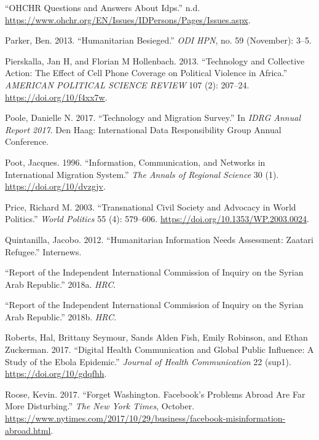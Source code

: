 \documentclass[
]{article}
\newlength{\cslhangindent}
\newenvironment{cslreferences}%
  {\setlength{\parindent}{0pt}%
  \everypar{\setlength{\hangindent}{\cslhangindent}}\ignorespaces}%
  {\par}
\begin{document}
\begin{cslreferences}
\leavevmode\hypertarget{ref-OHCHR}{}%
``OHCHR Questions and Answers About Idps.'' n.d.
\url{https://www.ohchr.org/EN/Issues/IDPersons/Pages/Issues.aspx}.

\leavevmode\hypertarget{ref-Parker2013Humanitarian}{}%
Parker, Ben. 2013. ``Humanitarian Besieged.'' \emph{ODI HPN}, no. 59
(November): 3--5.

\leavevmode\hypertarget{ref-Pierskalla2013Technology}{}%
Pierskalla, Jan H, and Florian M Hollenbach. 2013. ``Technology and
Collective Action: The Effect of Cell Phone Coverage on Political
Violence in Africa.'' \emph{AMERICAN POLITICAL SCIENCE REVIEW} 107 (2):
207--24. \url{https://doi.org/10/f4xx7w}.

\leavevmode\hypertarget{ref-Poole2017Technology}{}%
Poole, Danielle N. 2017. ``Technology and Migration Survey.'' In
\emph{IDRG Annual Report 2017}. Den Haag: International Data
Responsibility Group Annual Conference.

\leavevmode\hypertarget{ref-Poot1996Information}{}%
Poot, Jacques. 1996. ``Information, Communication, and Networks in
International Migration System.'' \emph{The Annals of Regional Science}
30 (1). \url{https://doi.org/10/dvzgjv}.

\leavevmode\hypertarget{ref-Price2003Transnational}{}%
Price, Richard M. 2003. ``Transnational Civil Society and Advocacy in
World Politics.'' \emph{World Politics} 55 (4): 579--606.
\url{https://doi.org/10.1353/WP.2003.0024}.

\leavevmode\hypertarget{ref-Quintanilla2012Humanitarian}{}%
Quintanilla, Jacobo. 2012. ``Humanitarian Information Needs Assessment:
Zaatari Refugee.'' Internews.

\leavevmode\hypertarget{ref-Feb2018Report}{}%
``Report of the Independent International Commission of Inquiry on the
Syrian Arab Republic.'' 2018a. \emph{HRC}.

\leavevmode\hypertarget{ref-August2018Report}{}%
``Report of the Independent International Commission of Inquiry on the
Syrian Arab Republic.'' 2018b. \emph{HRC}.

\leavevmode\hypertarget{ref-Roberts2017Digital}{}%
Roberts, Hal, Brittany Seymour, Sands Alden Fish, Emily Robinson, and
Ethan Zuckerman. 2017. ``Digital Health Communication and Global Public
Influence: A Study of the Ebola Epidemic.'' \emph{Journal of Health
Communication} 22 (sup1). \url{https://doi.org/10/gdqfhh}.

\leavevmode\hypertarget{ref-Roose2017Forget}{}%
Roose, Kevin. 2017. ``Forget Washington. Facebook's Problems Abroad Are
Far More Disturbing.'' \emph{The New York Times}, October.
\url{https://www.nytimes.com/2017/10/29/business/facebook-misinformation-abroad.html}.


\end{cslreferences}
\end{document}
